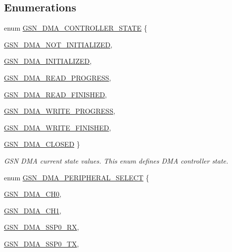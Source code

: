 \subsection*{Enumerations}
\begin{DoxyCompactItemize}
\item 
enum \hyperlink{a00645_gae429fb6067bac27636298d334042de5f}{GSN\_\-DMA\_\-CONTROLLER\_\-STATE} \{ \par
\hyperlink{a00645_ggae429fb6067bac27636298d334042de5fa0d1e91ccd13f6bd142fd6eb1385e78bc}{GSN\_\-DMA\_\-NOT\_\-INITIALIZED}, 
\par
\hyperlink{a00645_ggae429fb6067bac27636298d334042de5fa0433ffe774a15bcfdcd9b21200e85208}{GSN\_\-DMA\_\-INITIALIZED}, 
\par
\hyperlink{a00645_ggae429fb6067bac27636298d334042de5fa3f84bcdf20eef7fe9e6e90260a20d4d2}{GSN\_\-DMA\_\-READ\_\-PROGRESS}, 
\par
\hyperlink{a00645_ggae429fb6067bac27636298d334042de5fa76c62ae5f70d75b8c5d13a7aa4cd3b4d}{GSN\_\-DMA\_\-READ\_\-FINISHED}, 
\par
\hyperlink{a00645_ggae429fb6067bac27636298d334042de5fa177f0d0180ad7c6fec9aa2e0bdbab18a}{GSN\_\-DMA\_\-WRITE\_\-PROGRESS}, 
\par
\hyperlink{a00645_ggae429fb6067bac27636298d334042de5fa8c4aba63d65be601ef1bd9e3797e9740}{GSN\_\-DMA\_\-WRITE\_\-FINISHED}, 
\par
\hyperlink{a00645_ggae429fb6067bac27636298d334042de5fa97fc87797fc55f072f93fcfb08e823d9}{GSN\_\-DMA\_\-CLOSED}
 \}
\begin{DoxyCompactList}\small\item\em GSN DMA current state values. This enum defines DMA controller state. \end{DoxyCompactList}\item 
enum \hyperlink{a00645_ga6b06d19717ade6dfd815a84e83d2388c}{GSN\_\-DMA\_\-PERIPHERAL\_\-SELECT} \{ \par
\hyperlink{a00645_gga6b06d19717ade6dfd815a84e83d2388ca8d81a773b5a1dcfdfb741cfbfbf5330d}{GSN\_\-DMA\_\-CH0}, 
\par
\hyperlink{a00645_gga6b06d19717ade6dfd815a84e83d2388ca67e0d61a7ec720eed458dbdf9eeb791a}{GSN\_\-DMA\_\-CH1}, 
\par
\hyperlink{a00645_gga6b06d19717ade6dfd815a84e83d2388cac5675c7dde41ebb7a1777403463362ed}{GSN\_\-DMA\_\-SSP0\_\-RX}, 
\par
\hyperlink{a00645_gga6b06d19717ade6dfd815a84e83d2388ca55b975756ec5f35fe79579374eacdfd3}{GSN\_\-DMA\_\-SSP0\_\-TX}, 
\par

\end{DoxyCompactItemize}
